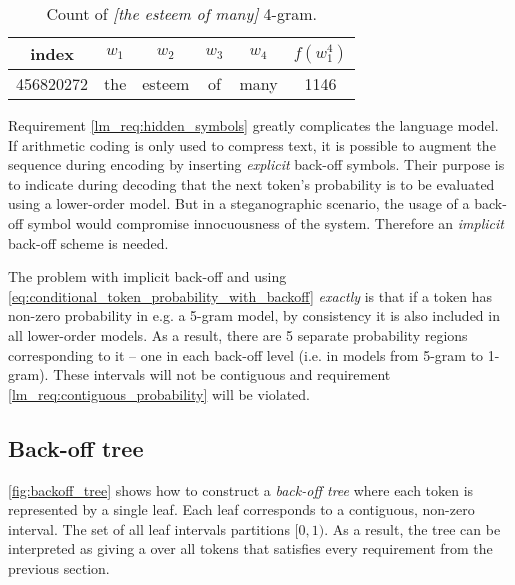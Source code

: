 \documentclass[draft]{IIBproject}
\makeatletter
\DeclareRobustCommand*{\eg}{e.g.\@\xspace}
\DeclareRobustCommand*{\ie}{i.e.\@\xspace}
\DeclareRobustCommand*{\AbbreviationWithDot}[1]{\@ifnextchar{.}{#1}{#1.\@\xspace}}
\DeclareRobustCommand*{\pmf}{\AbbreviationWithDot{p.m.f}}
\DeclareRobustCommand{\ngram}[1]{\emph{[#1]}}
\makeatother
\begin{document}
\begin{table}[h]
	\centering
	\begin{tabular}{c | *{4}{| c} || c}
	index & $w_1$ & $w_2$ & $w_3$ & $w_4$ & $f(w_1^4)$ \\
	\hline
	\num{456820272} & the & esteem & of & many & 1146
	\end{tabular}
	\caption{\label{tab:the_esteem_of_many}Count of \ngram{the esteem of many} 4-gram.}
\end{table}

Requirement \ref{lm_req:hidden_symbols} greatly complicates the language model. If arithmetic coding is only used to compress text, it is possible to augment the sequence during encoding by inserting \emph{explicit} back-off symbols. Their purpose is to indicate during decoding that the next token's probability is to be evaluated using a lower-order model. But in a steganographic scenario, the usage of a back-off symbol would compromise innocuousness of the system. Therefore an \emph{implicit} back-off scheme is needed.

The problem with implicit back-off and using \cref{eq:conditional_token_probability_with_backoff} \emph{exactly} is that if a token has non-zero probability in \eg a 5-gram model, by consistency it is also included in all lower-order models. As a result, there are 5 separate probability regions corresponding to it -- one in each back-off level (\ie in models from 5-gram to 1-gram). These intervals will not be contiguous and requirement \ref{lm_req:contiguous_probability} will be violated.

\FloatBarrier
\subsection{Back-off tree}

\cref{fig:backoff_tree} shows how to construct a \emph{back-off tree} where each token is represented by a single leaf. Each leaf corresponds to a contiguous, non-zero interval. The set of all leaf intervals partitions $[0,1)$. As a result, the tree can be interpreted as giving a \pmf over all tokens that satisfies every requirement from the previous section.

\newlength{\vertexSize}
\setlength{\vertexSize}{10 pt}

\end{document}
